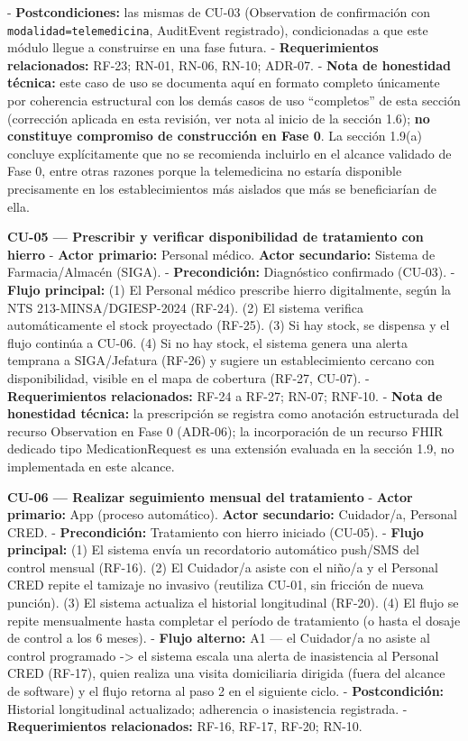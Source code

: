 \documentclass[11pt,a4paper]{article}
\begin{document}
- \textbf{Postcondiciones:} las mismas de CU-03 (Observation de confirmación con \texttt{modalidad=telemedicina}, AuditEvent registrado), condicionadas a que este módulo llegue a construirse en una fase futura.
- \textbf{Requerimientos relacionados:} RF-23; RN-01, RN-06, RN-10; ADR-07.
- \textbf{Nota de honestidad técnica:} este caso de uso se documenta aquí en formato completo únicamente por coherencia estructural con los demás casos de uso ``completos'' de esta sección (corrección aplicada en esta revisión, ver nota al inicio de la sección 1.6); \textbf{no constituye compromiso de construcción en Fase 0}. La sección 1.9(a) concluye explícitamente que no se recomienda incluirlo en el alcance validado de Fase 0, entre otras razones porque la telemedicina no estaría disponible precisamente en los establecimientos más aislados que más se beneficiarían de ella.

\textbf{CU-05 --- Prescribir y verificar disponibilidad de tratamiento con hierro}
- \textbf{Actor primario:} Personal médico. \textbf{Actor secundario:} Sistema de Farmacia/Almacén (SIGA).
- \textbf{Precondición:} Diagnóstico confirmado (CU-03).
- \textbf{Flujo principal:} (1) El Personal médico prescribe hierro digitalmente, según la NTS 213-MINSA/DGIESP-2024 (RF-24). (2) El sistema verifica automáticamente el stock proyectado (RF-25). (3) Si hay stock, se dispensa y el flujo continúa a CU-06. (4) Si no hay stock, el sistema genera una alerta temprana a SIGA/Jefatura (RF-26) y sugiere un establecimiento cercano con disponibilidad, visible en el mapa de cobertura (RF-27, CU-07).
- \textbf{Requerimientos relacionados:} RF-24 a RF-27; RN-07; RNF-10.
- \textbf{Nota de honestidad técnica:} la prescripción se registra como anotación estructurada del recurso Observation en Fase 0 (ADR-06); la incorporación de un recurso FHIR dedicado tipo MedicationRequest es una extensión evaluada en la sección 1.9, no implementada en este alcance.

\textbf{CU-06 --- Realizar seguimiento mensual del tratamiento}
- \textbf{Actor primario:} App (proceso automático). \textbf{Actor secundario:} Cuidador/a, Personal CRED.
- \textbf{Precondición:} Tratamiento con hierro iniciado (CU-05).
- \textbf{Flujo principal:} (1) El sistema envía un recordatorio automático push/SMS del control mensual (RF-16). (2) El Cuidador/a asiste con el niño/a y el Personal CRED repite el tamizaje no invasivo (reutiliza CU-01, sin fricción de nueva punción). (3) El sistema actualiza el historial longitudinal (RF-20). (4) El flujo se repite mensualmente hasta completar el período de tratamiento (o hasta el dosaje de control a los 6 meses).
- \textbf{Flujo alterno:} A1 --- el Cuidador/a no asiste al control programado -\textgreater{} el sistema escala una alerta de inasistencia al Personal CRED (RF-17), quien realiza una visita domiciliaria dirigida (fuera del alcance de software) y el flujo retorna al paso 2 en el siguiente ciclo.
- \textbf{Postcondición:} Historial longitudinal actualizado; adherencia o inasistencia registrada.
- \textbf{Requerimientos relacionados:} RF-16, RF-17, RF-20; RN-10.
\end{document}
